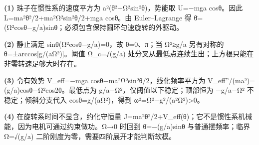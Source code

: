 \par\noindent\textbf{(1)} 珠子在惯性系的速度平方为 a²(θ̇²+Ω²sin²θ)，势能取 U=−mga cosθ。因此 L=ma²θ̇²/2+ma²Ω²sin²θ/2+mga cosθ。由 Euler–Lagrange 得 θ̈=(Ω²cosθ−g/a)sinθ；必须包含保持圆环匀速旋转的外驱动。
\par\noindent\textbf{(2)} 静止满足 sinθ(Ω²cosθ−g/a)=0，故 θ=0、π；当 Ω²≥g/a 另有对称的 θ=±arccos[g/(aΩ²)]。阈值 Ω\_c=√(g/a) 处分叉从最低点连续生出；上方根只能在非零转速足够大时存在。
\par\noindent\textbf{(3)} 令有效势 V\_eff=−mga cosθ−ma²Ω²sin²θ/2，线化频率平方为 V\_eff''/(ma²)= (g/a)cosθ−Ω²cos2θ。最低点为 g/a−Ω²，仅阈值以下稳定；顶部恒为 −g/a−Ω² 不稳定；倾斜分支代入 cosθ=g/(aΩ²)，得到 ω²=Ω²−g²/(a²Ω²)>0。
\par\noindent\textbf{(4)} 在旋转系时间不显含，约化守恒量 J=ma²θ̇²/2+V\_eff(θ)；它不是惯性系机械能，因为电机可通过约束做功。Ω→0 时回到 θ̈=−(g/a)sinθ 与普通摆频率；临界 Ω=√(g/a) 二阶刚度为零，需要四阶展开才能判断软模。
